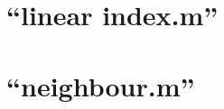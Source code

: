 \section{``linear index.m''}

\vspace{2em}

\section{``neighbour.m''}

\clearpage

%

%




\startnewchapter



%
